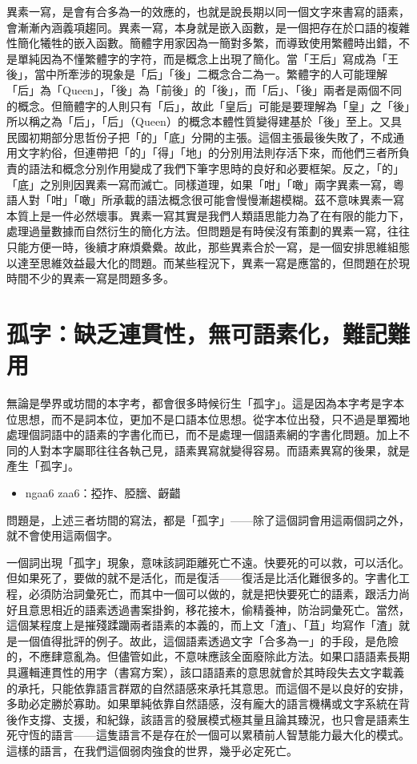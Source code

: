 \documentclass[a5paper, 10pt, openany]{book} %
\begin{document}
異素一寫，是會有合多為一的效應的，也就是說長期以同一個文字來書寫的語素，會漸漸內涵義項趨同。異素一寫，本身就是嵌入函數，是一個把存在於口語的複雜性簡化犧牲的嵌入函數。簡體字用家因為一簡對多繁，而導致使用繁體時出錯，不是單純因為不懂繁體字的字符，而是概念上出現了簡化。當「王后」寫成為「王後」，當中所牽涉的現象是「后」「後」二概念合二為一。繁體字的人可能理解「后」為「Queen」，「後」為「前後」的「後」，而「后」、「後」兩者是兩個不同的概念。但簡體字的人則只有「后」，故此「皇后」可能是要理解為「皇」之「後」所以稱之為「后」，「后」（Queen）的概念本體性質變得建基於「後」至上。又具民國初期部分思哲份子把「的」「底」分開的主張。這個主張最後失敗了，不成通用文字約俗，但連帶把「的」「得」「地」的分別用法則存活下來，而他們三者所負責的語法和概念分別作用變成了我們下筆字思時的良好和必要框架。反之，「的」「底」之別則因異素一寫而滅亡。同樣道理，如果「咁」「噉」兩字異素一寫，粵語人對「咁」「噉」所承載的語法概念很可能會慢慢漸趨模糊。茲不意味異素一寫本質上是一件必然壞事。異素一寫其實是我們人類語思能力為了在有限的能力下，處理過量數據而自然衍生的簡化方法。但問題是有時侯沒有策劃的異素一寫，往往只能方便一時，後續才麻煩纍纍。故此，那些異素合於一寫，是一個安排思維組態以達至思維效益最大化的問題。而某些程況下，異素一寫是應當的，但問題在於現時間不少的異素一寫是問題多多。

\section{孤字：缺乏連貫性，無可語素化，難記難用}

無論是學界或坊間的本字考，都會很多時候衍生「孤字」。這是因為本字考是字本位思想，而不是詞本位，更加不是口語本位思想。從字本位出發，只不過是單獨地處理個詞語中的語素的字書化而已，而不是處理一個語素網的字書化問題。加上不同的人對本字屬耶往往各執己見，語素異寫就變得容易。而語素異寫的後果，就是產生「孤字」。

\begin{itemize}
  \item  ngaa6 zaa6：掗拃、𦜖膪、齖齰
\end{itemize}

問題是，上述三者坊間的寫法，都是「孤字」——除了這個詞會用這兩個詞之外，就不會使用這兩個字。

一個詞出現「孤字」現象，意味該詞距離死亡不遠。快要死的可以救，可以活化。但如果死了，要做的就不是活化，而是復活——復活是比活化難很多的。字書化工程，必須防治詞彙死亡，而其中一個可以做的，就是把快要死亡的語素，跟活力尚好且意思相近的語素透過書案掛鉤，移花接木，偷精養神，防治詞彙死亡。當然，這個某程度上是摧殘蹂躪兩者語素的本義的，而上文「渣」、「苴」均寫作「渣」就是一個值得批評的例子。故此，這個語素透過文字「合多為一」的手段，是危險的，不應肆意亂為。但儘管如此，不意味應該全面廢除此方法。如果口語語素長期具邏輯連貫性的用字（書寫方案），該口語語素的意思就會於其時段失去文字載義的承托，只能依靠語言群眾的自然語感來承托其意思。而這個不是以良好的安排，多助必定勝於寡助。如果單純依靠自然語感，沒有龐大的語言機構或文字系統在背後作支撐、支援，和紀錄，該語言的發展模式極其量且論其臻況，也只會是語素生死守恆的語言——這隻語言不是存在於一個可以累積前人智慧能力最大化的模式。這樣的語言，在我們這個弱肉強食的世界，幾乎必定死亡。
\end{document}
